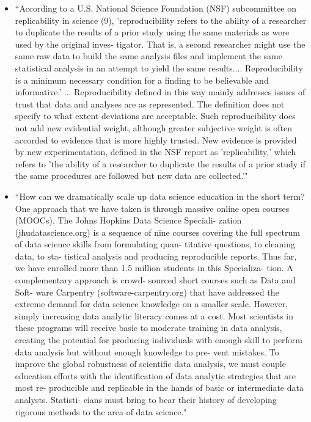 \documentclass[pdftex,english,11pt,parskip=half]{scrartcl}
\begin{document}
\begin{itemize}
\item ``According to a U.S. National Science Foundation (NSF) subcommittee on replicability in science (9), 'reproducibility refers to the ability of a researcher to duplicate the results of a prior study using the same materials as were used by the original inves- tigator. That is, a second researcher might use the same raw data to build the same analysis files and implement the same statistical analysis in an attempt to yield the same results.... Reproducibility is a minimum necessary condition for a finding to be believable and informative.' ... Reproducibility defined in this way mainly addresses issues of trust that data and analyses are as represented. The definition does not specify to what extent deviations are acceptable. Such reproducibility does not add new evidential weight, although greater subjective weight is often accorded to evidence that is more highly trusted. New evidence is provided by new experimentation, defined in the NSF report as 'replicability,' which refers to 'the ability of a researcher to duplicate the results of a prior study if the same procedures are followed but new data are collected.'" \cite{goodman2016does}
\item ``How can we dramatically scale up data science education in the short term? One approach that we have taken is through massive online open courses (MOOCs). The Johns Hopkins Data Science Speciali- zation (jhudatascience.org) is a sequence of nine courses covering the full spectrum of data science skills from formulating quan- titative questions, to cleaning data, to sta- tistical analysis and producing reproducible reports. Thus far, we have enrolled more than 1.5 million students in this Specializa- tion. A complementary approach is crowd- sourced short courses such as Data and Soft- ware Carpentry (software-carpentry.org) that have addressed the extreme demand for data science knowledge on a smaller scale. However, simply increasing data analytic literacy comes at a cost. Most scientists in these programs will receive basic to moderate training in data analysis, creating the potential for producing individuals with enough skill to perform data analysis but without enough knowledge to pre- vent mistakes.
To improve the global robustness of scientific data analysis, we must couple education efforts with the identification of data analytic strategies that are most re- producible and replicable in the hands of basic or intermediate data analysts. Statisti- cians must bring to bear their history of developing rigorous methods to the area of data science." \cite{leek2015opinion}

\end{itemize}
\end{document}
